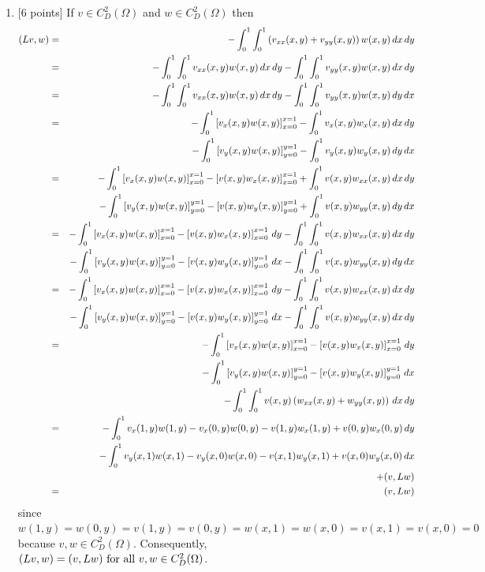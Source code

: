 \begin{solution}
\begin{enumerate}
\item {[6 points]} If $v\in C^2_D(\Omega)$ and $w\in C^2_D(\Omega)$ then
\begin{eqnarray*}
(Lv,w) &=& -\int_0^1 \int_0^1 \left(v_{xx}(x,y)+v_{yy}(x,y)\right) w(x,y)\,dx\,dy
\\
&=& -\int_0^1 \int_0^1 v_{xx}(x,y)w(x,y)\,dx\,dy-\int_0^1 \int_0^1 v_{yy}(x,y)w(x,y)\,dx\,dy
\\
&=& -\int_0^1 \int_0^1 v_{xx}(x,y)w(x,y)\,dx\,dy-\int_0^1 \int_0^1 v_{yy}(x,y)w(x,y)\,dy\,dx
\\
&=& -\int_0^1 \left[v_x(x,y)w(x,y)\right]_{x=0}^{x=1}-\int_0^1 v_x(x,y)w_x(x,y)\,dx\,dy
\\
&&-\int_0^1 \left[v_y(x,y)w(x,y)\right]_{y=0}^{y=1}-\int_0^1 v_y(x,y)w_y(x,y)\,dy\,dx
\\
&=& -\int_0^1 \left[v_x(x,y)w(x,y)\right]_{x=0}^{x=1}-\left[v(x,y)w_x(x,y)\right]_{x=0}^{x=1}+\int_0^1 v(x,y)w_{xx}(x,y)\,dx\,dy
\\
&&-\int_0^1 \left[v_y(x,y)w(x,y)\right]_{y=0}^{y=1}-\left[v(x,y)w_y(x,y)\right]_{y=0}^{y=1}+\int_0^1 v(x,y)w_{yy}(x,y)\,dy\,dx
\\
&=& -\int_0^1 \left[v_x(x,y)w(x,y)\right]_{x=0}^{x=1}-\left[v(x,y)w_x(x,y)\right]_{x=0}^{x=1}\,dy-\int_0^1\int_0^1 v(x,y)w_{xx}(x,y)\,dx\,dy
\\
&&-\int_0^1 \left[v_y(x,y)w(x,y)\right]_{y=0}^{y=1}-\left[v(x,y)w_y(x,y)\right]_{y=0}^{y=1}\,dx-\int_0^1\int_0^1 v(x,y)w_{yy}(x,y)\,dy\,dx
\\
&=& -\int_0^1 \left[v_x(x,y)w(x,y)\right]_{x=0}^{x=1}-\left[v(x,y)w_x(x,y)\right]_{x=0}^{x=1}\,dy-\int_0^1\int_0^1 v(x,y)w_{xx}(x,y)\,dx\,dy
\\
&&-\int_0^1 \left[v_y(x,y)w(x,y)\right]_{y=0}^{y=1}-\left[v(x,y)w_y(x,y)\right]_{y=0}^{y=1}\,dx-\int_0^1\int_0^1 v(x,y)w_{yy}(x,y)\,dx\,dy
\\
&=& -\int_0^1 \left[v_x(x,y)w(x,y)\right]_{x=0}^{x=1}-\left[v(x,y)w_x(x,y)\right]_{x=0}^{x=1}\,dy
\\
&&-\int_0^1 \left[v_y(x,y)w(x,y)\right]_{y=0}^{y=1}-\left[v(x,y)w_y(x,y)\right]_{y=0}^{y=1}\,dx
\\
&&-\int_0^1\int_0^1 v(x,y)\left(w_{xx}(x,y)+w_{yy}(x,y)\right)\,dx\,dy
\\
&=& -\int_0^1 v_x(1,y)w(1,y)-v_x(0,y)w(0,y)-v(1,y)w_x(1,y)+v(0,y)w_x(0,y)\,dy
\\
&&-\int_0^1 v_y(x,1)w(x,1)-v_y(x,0)w(x,0)-v(x,1)w_y(x,1)+v(x,0)w_y(x,0)\,dx
\\
&&+(v,Lw)
\\
&=& (v,Lw)
\end{eqnarray*}
since $w(1,y)=w(0,y)=v(1,y)=v(0,y)=w(x,1)=w(x,0)=v(x,1)=v(x,0)=0$ because $v,w\in C^2_D(\Omega)$. Consequently, $(Lv,w)=(v,Lw)\mbox{ for all }v,w\in C^2_D(\Omega)$.


\end{enumerate}
\end{solution}
